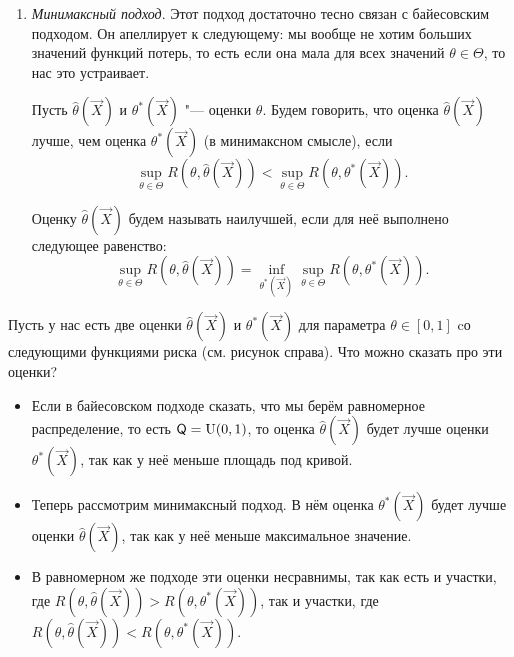 \begin{enumerate}
	\item \emph{Минимаксный подход}.\label{lec2:minimax} Этот подход достаточно тесно связан с байесовским подходом. Он апеллирует к следующему: мы вообще не хотим больших значений функций потерь, то есть если она мала для всех значений $\theta \in \Theta$, то нас это устраивает.
	\begin{definition}
		Пусть $\hat{\theta}(\vec{X})$ и $\theta^{*}(\vec{X})$ "--- оценки $\theta$. Будем говорить, что оценка $\hat{\theta}(\vec{X})$ лучше, чем оценка $\theta^{*}(\vec{X})$ (в минимаксном смысле), если
		\[
		\sup_{\theta \in \Theta} R(\theta, \hat{\theta}(\vec{X})) < \sup_{\theta \in \Theta} R(\theta, \theta^{*}(\vec{X})).
		\]
		
		Оценку $\hat{\theta}(\vec{X})$ будем называть наилучшей, если для неё выполнено следующее равенство:
		\[
			\sup_{\theta \in \Theta} R(\theta, \hat{\theta}(\vec{X})) = \inf_{\theta^{*}(\vec{X})} \sup_{\theta \in \Theta} R(\theta, \theta^{*}(\vec{X})).
		\]
	\end{definition}
\end{enumerate}

\begin{wrapfigure}[16]{r}{0.5\textwidth}
	\vspace{-10pt}
\end{wrapfigure}
Пусть у нас есть две оценки $\hat{\theta}(\vec{X})$ и $\theta^{*}(\vec{X})$ для параметра $\theta \in [0, 1]$ cо следующими функциями риска (см. рисунок справа). Что можно сказать про эти оценки?
\begin{itemize}
	\item Если в байесовском подходе сказать, что мы берём равномерное распределение, то есть $\mathsf{Q} = \mathrm{U}(0, 1)$, то оценка $\hat{\theta}(\vec{X})$ будет лучше оценки $\theta^{*}(\vec{X})$, так как у неё меньше площадь под кривой.
	\item Теперь рассмотрим минимаксный подход. В нём оценка $\theta^{*}(\vec{X})$ будет лучше оценки $\hat{\theta}(\vec{X})$, так как у неё меньше максимальное значение.
	\item В равномерном же подходе эти оценки несравнимы, так как есть и участки, где $R(\theta, \hat{\theta}(\vec{X})) > R(\theta, \theta^{*}(\vec{X}))$, так и участки, где $R(\theta, \hat{\theta}(\vec{X})) < R(\theta, \theta^{*}(\vec{X}))$.
\end{itemize}

